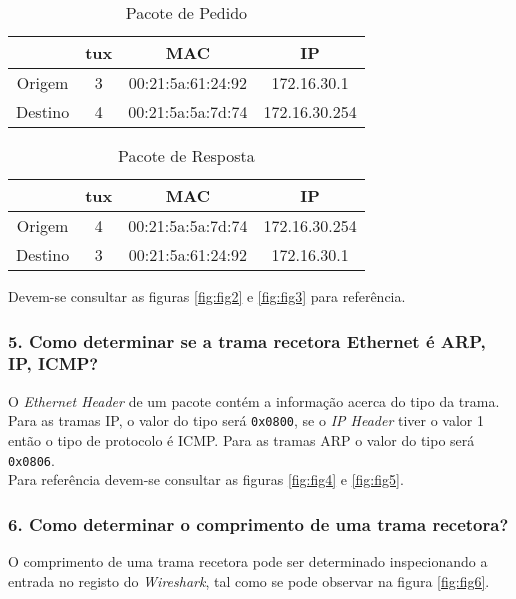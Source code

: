 \begin{table}[ht]
\begin{center}
 	\begin{tabular}{|| c | c c c||} 
 		\hline
 		& tux & MAC & IP \\ [0.5ex] 
 		\hline\hline
 		Origem & 3 & 00:21:5a:61:24:92 & 172.16.30.1 \\ 
 		\hline
 		Destino & 4 & 00:21:5a:5a:7d:74 & 172.16.30.254 \\ [1ex] 
 		\hline
	\end{tabular}
	\caption{Pacote de Pedido}
	\label{tab:table1}
\end{center}
\end{table}

\begin{table}[ht]
\begin{center}
 	\begin{tabular}{|| c | c c c||} 
 		\hline
 		& tux & MAC & IP \\ [0.5ex] 
 		\hline\hline
 		Origem & 4 & 00:21:5a:5a:7d:74 & 172.16.30.254 \\ 
 		\hline
 		Destino & 3 & 00:21:5a:61:24:92 & 172.16.30.1 \\ [1ex] 
 		\hline
	\end{tabular}
	\caption{Pacote de Resposta}
	\label{tab:table2}
\end{center}
\end{table}

Devem-se consultar as figuras \ref{fig:fig2} e \ref{fig:fig3} para referência.

\subsubsection{5. Como determinar se a trama recetora Ethernet é ARP, IP, ICMP?}
O \emph{Ethernet Header} de um pacote contém a informação acerca do tipo da trama. Para as tramas IP, o valor do tipo será \verb+0x0800+, se o \emph{IP Header} tiver o valor 1 então o tipo de protocolo é ICMP. Para as tramas ARP o valor do tipo será \verb+0x0806+.\\
Para referência devem-se consultar as figuras \ref{fig:fig4} e \ref{fig:fig5}.

\subsubsection{6. Como determinar o comprimento de uma trama recetora?}
O  comprimento  de  uma  trama recetora pode ser determinado inspecionando a entrada no registo do \emph{Wireshark}, tal como se pode observar na figura \ref{fig:fig6}.